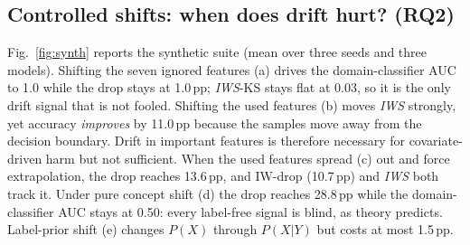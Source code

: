 \documentclass[conference]{IEEEtran}
\theoremstyle{plainhead}
\newcommand{\iws}{\textit{IWS}}
\newcommand{\pp}{\,pp\xspace}
\begin{document}
\subsection{Controlled shifts: when does drift hurt? (RQ2)}
\label{sec:synth}
Fig.~\ref{fig:synth} reports the synthetic suite (mean over three seeds and three models). Shifting the seven ignored features (a) drives the domain-classifier AUC to 1.0 while the drop stays at 1.0\pp; \iws{}-KS stays flat at 0.03, so it is the only drift signal that is not fooled. Shifting the used features (b) moves \iws{} strongly, yet accuracy \emph{improves} by 11.0\pp because the samples move away from the decision boundary. Drift in important features is therefore necessary for covariate-driven harm but not sufficient. When the used features spread (c) out and force extrapolation, the drop reaches 13.6\pp, and IW-drop (10.7\pp) and \iws{} both track it. Under pure concept shift (d) the drop reaches 28.8\pp while the domain-classifier AUC stays at 0.50: every label-free signal is blind, as theory predicts. Label-prior shift (e) changes $P(X)$ through $P(X|Y)$ but costs at most 1.5\pp.
\end{document}
